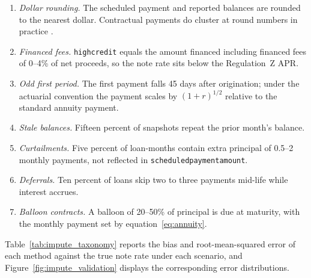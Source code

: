 \begin{enumerate}
\item[(a)] \emph{Dollar rounding.} The scheduled payment and reported balances are rounded to the nearest dollar. Contractual payments do cluster at round numbers in practice \citep{argyle_monthly_2020}.
\item[(b)] \emph{Financed fees.} \texttt{highcredit} equals the amount financed including financed fees of 0--4\% of net proceeds, so the note rate sits below the Regulation~Z APR.
\item[(c)] \emph{Odd first period.} The first payment falls 45 days after origination; under the actuarial convention the payment scales by $(1+r)^{1/2}$ relative to the standard annuity payment.
\item[(d)] \emph{Stale balances.} Fifteen percent of snapshots repeat the prior month's balance.
\item[(e)] \emph{Curtailments.} Five percent of loan-months contain extra principal of 0.5--2 monthly payments, not reflected in \texttt{scheduled\allowbreak payment\allowbreak amount}.
\item[(f)] \emph{Deferrals.} Ten percent of loans skip two to three payments mid-life while interest accrues.
\item[(g)] \emph{Balloon contracts.} A balloon of 20--50\% of principal is due at maturity, with the monthly payment set by equation~\eqref{eq:annuity}.
\end{enumerate}

Table~\ref{tab:impute_taxonomy} reports the bias and root-mean-squared error of each method against the true note rate under each scenario, and Figure~\ref{fig:impute_validation} displays the corresponding error distributions.

